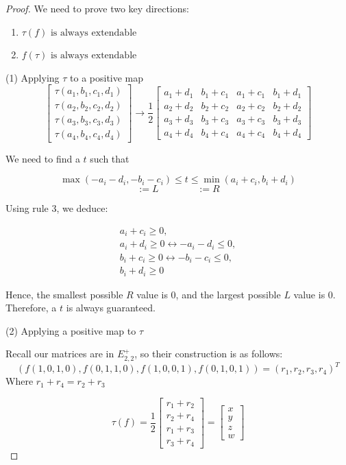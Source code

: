 \documentclass[11pt]{amsart}
\theoremstyle{definition}
\begin{document}
\begin{proof} We need to prove two key directions:
\begin{enumerate}
    \item \(\tau(f) \text{ is always extendable} \)
    
    \item \(f(\tau) \text{ is always extendable} \)
\end{enumerate}


(1) Applying \(\tau\) to a positive map
\[
\begin{bmatrix}
\tau(a_1, b_1, c_1, d_1) \\
\tau(a_2, b_2, c_2, d_2) \\
\tau(a_3, b_3, c_3, d_3) \\
\tau(a_4, b_4, c_4, d_4)
\end{bmatrix}
\rightarrow
\frac{1}{2} \begin{bmatrix}
a_1 + d_1 & b_1 + c_1 & a_1 + c_1 & b_1 + d_1 \\
a_2 + d_2 & b_2 + c_2 & a_2 + c_2 & b_2 + d_2 \\
a_3 + d_3 & b_3 + c_3 & a_3 + c_3 & b_3 + d_3 \\
a_4 + d_4 & b_4 + c_4 & a_4 + c_4 & b_4 + d_4
\end{bmatrix}
\]


We need to find a \(t\) such that

\[
\max(-a_i - d_i, -b_i - c_i) \leq t \leq \min(a_i + c_i, b_i + d_i)
\]
\[
:= L \quad \quad \quad \quad := R
\]

Using rule 3, we deduce: 

\begin{align*}
    a_i + c_i \geq 0, \\
    a_i + d_i \geq 0 \leftrightarrow -a_i - d_i \leq 0, \\
    b_i + c_i \geq 0 \leftrightarrow -b_i - c_i \leq 0,\\
    b_i + d_i \geq 0
\end{align*}

Hence, the smallest possible \(R\) value is 0, and the largest possible \(L\) value is 0. Therefore, a \(t\) is always guaranteed.

(2) Applying a positive map to \(\tau\)

Recall our matrices are in $E^+_{2,2}$, so their construction is as follows:
\[
(f(1, 0, 1, 0), f(0, 1, 1, 0), f(1, 0, 0, 1), f(0, 1, 0, 1)) = (r_1, r_2, r_3, r_4)^T
\]
Where $r_1 + r_4 = r_2 + r_3$

\[
\tau(f) = 
\frac{1}{2} \begin{bmatrix}
r_1 + r_2 \\
r_2 + r_4 \\
r_1 + r_3 \\
r_3 + r_4
\end{bmatrix}
=
\begin{bmatrix}
x \\
y \\
z \\
w
\end{bmatrix}
\]


\end{proof}
\end{document}
